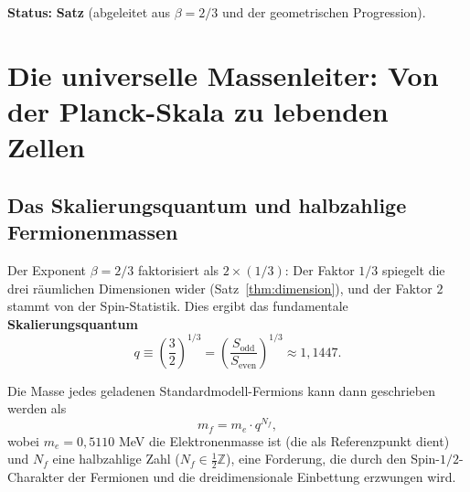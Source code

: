 \documentclass[12pt,a4paper]{article}
\begin{document}
	\textbf{Status:} \textbf{Satz} (abgeleitet aus \(\beta = 2/3\) und der geometrischen Progression).
	
	\section{Die universelle Massenleiter: Von der Planck-Skala zu lebenden Zellen}
	\label{sec:mass-ladder}
	
	\subsection{Das Skalierungsquantum und halbzahlige Fermionenmassen}
	
	Der Exponent \(\beta = 2/3\) faktorisiert als \(2 \times (1/3)\): Der Faktor \(1/3\) spiegelt die drei räumlichen Dimensionen wider (Satz~\ref{thm:dimension}), und der Faktor \(2\) stammt von der Spin-Statistik. Dies ergibt das fundamentale \textbf{Skalierungsquantum}
	\begin{equation}
		q \equiv \left(\frac{3}{2}\right)^{1/3} = \left(\frac{S_{\mathrm{odd}}}{S_{\mathrm{even}}}\right)^{1/3} \approx 1,1447.
	\end{equation}
	
	Die Masse jedes geladenen Standardmodell-Fermions kann dann geschrieben werden als
	\begin{equation}
		\boxed{m_f = m_e \cdot q^{N_f}},
		\label{eq:mass-quantization}
	\end{equation}
	wobei \(m_e = 0,5110\) MeV die Elektronenmasse ist (die als Referenzpunkt dient) und \(N_f\) eine halbzahlige Zahl (\(N_f \in \frac{1}{2}\mathbb{Z}\)), eine Forderung, die durch den Spin-\(1/2\)-Charakter der Fermionen und die dreidimensionale Einbettung erzwungen wird.
	
\end{document}
